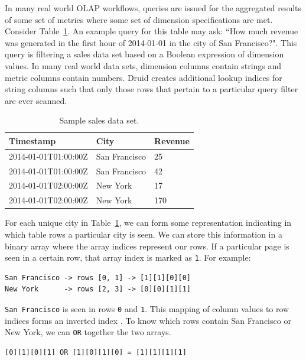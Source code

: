 \documentclass{vldb}
\begin{document}
In many real world OLAP workflows, queries are issued for the aggregated
results of some set of metrics where some set of dimension specifications are
met. Consider Table~\ref{tab:sample_data}. An example query for this table may
ask: ``How much revenue was generated in the first hour of 2014-01-01 in the
city of San Francisco?". This query is filtering a sales data set based on a
Boolean expression of dimension values. In many real world data sets, dimension
columns contain strings and metric columns contain numbers. Druid creates
additional lookup indices for string columns such that only those rows that
pertain to a particular query filter are ever scanned.

\begin{table}
  \centering
  \begin{tabular}{| l | l | l |}
    \hline
    \textbf{Timestamp} & \textbf{City} & \textbf{Revenue} \\ \hline
    2014-01-01T01:00:00Z & San Francisco & 25 \\ \hline
    2014-01-01T01:00:00Z & San Francisco & 42 \\ \hline
    2014-01-01T02:00:00Z & New York & 17 \\ \hline
    2014-01-01T02:00:00Z & New York & 170 \\ \hline
  \end{tabular}
  \caption{Sample sales data set.}
  \label{tab:sample_data}
\end{table}

For each unique city in
Table~\ref{tab:sample_data}, we can form some representation
indicating in which table rows a particular city is seen. We can
store this information in a binary array where the array indices
represent our rows. If a particular page is seen in a certain
row, that array index is marked as \texttt{1}. For example:
{\small\begin{verbatim}
San Francisco -> rows [0, 1] -> [1][1][0][0]
New York      -> rows [2, 3] -> [0][0][1][1]
\end{verbatim}}

\texttt{San Francisco} is seen in rows \texttt{0} and \texttt{1}. This mapping of column values
to row indices forms an inverted index \cite{tomasic1993performance}. To know which
rows contain {\ttfamily San Francisco} or {\ttfamily New York}, we can \texttt{OR} together
the two arrays.
{\small\begin{verbatim}
[0][1][0][1] OR [1][0][1][0] = [1][1][1][1]
\end{verbatim}}
\end{document}
